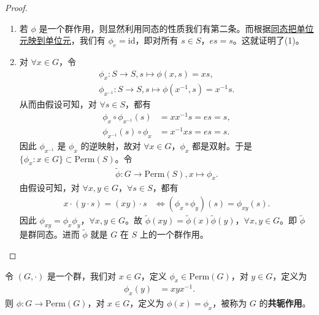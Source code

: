 \documentclass[../../main.tex]{subfiles}
\begin{document}
\begin{proof}
\begin{enumerate}[(1)]
\item 若 \(\phi\) 是一个群作用，则显然利用同态的性质我们有第二条。而根据\hyperref[proposition:群同态保持逆元和单位元]{同态把单位元映到单位元}，我们有 \(\phi_e = \mathrm{id}\)，即对所有 \(s \in S\)，\(es = s\)。这就证明了(1)。

\item 对 \(\forall x \in G\)，令
\begin{gather*}
\phi_x: S \to S,  s \mapsto \phi(x, s) = xs,\\
\phi_{x^{-1}}: S \to S,  s \mapsto \phi(x^{-1}, s) = x^{-1}s.
\end{gather*}
从而由假设可知，对 \(\forall s \in S\)，都有
\begin{align*}
\phi_x \circ \phi_{x^{-1}}(s) &= xx^{-1}s = es = s,\\
\phi_{x^{-1}}(s) \circ \phi_x &= x^{-1}xs = es = s.
\end{align*}
因此 \(\phi_{x^{-1}}\) 是 \(\phi_x\) 的逆映射，故对 \(\forall x \in G\)，\(\phi_x\) 都是双射。于是 \(\{\phi_x : x \in G\} \subset \mathrm{Perm}(S)\)。令
\begin{gather*}
\widetilde{\phi}: G \to \mathrm{Perm}(S), x \mapsto \phi_x.
\end{gather*}
由假设可知，对 \(\forall x, y \in G\)，\(\forall s \in S\)，都有
\begin{align*}
x \cdot (y \cdot s) = (xy) \cdot s &\Leftrightarrow (\phi_x \circ \phi_y)(s) = \phi_{xy}(s).
\end{align*}
因此 \(\phi_{xy} = \phi_x\phi_y\)，\(\forall x, y \in G\)。故 \(\widetilde{\phi}(xy) = \widetilde{\phi}(x)\widetilde{\phi}(y)\)，\(\forall x, y \in G\)。即 \(\widetilde{\phi}\) 是群同态。进而 \(\widetilde{\phi}\) 就是 \(G\) 在 \(S\) 上的一个群作用。 
\end{enumerate}
\end{proof}

\begin{definition}[共轭作用]
令 \((G, \cdot)\) 是一个群，我们对 \(x \in G\)，定义 \(\phi_x \in \mathrm{Perm}(G)\)，对 \(y \in G\)，定义为
\begin{align*}
\phi_x(y) &= xyx^{-1}.
\end{align*}
则 \(\phi: G \to \mathrm{Perm}(G)\)，对 \(x \in G\)，定义为 \(\phi(x) = \phi_x\)，被称为 \(G\) 的\textbf{共轭作用}。 
\end{definition}
\end{document}
